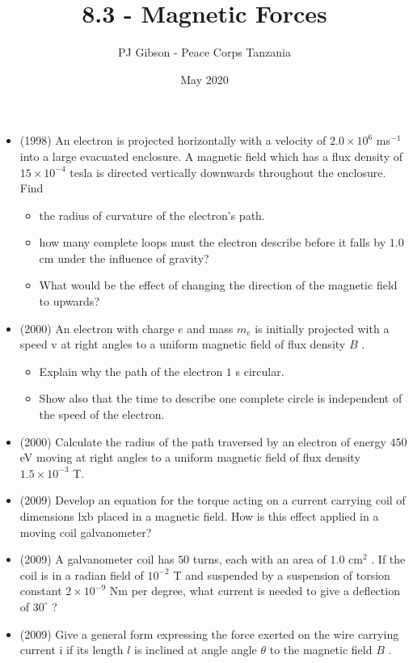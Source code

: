 \documentclass{article}
\title{\textbf{8.3 - Magnetic Forces}}
\author{PJ Gibson - Peace Corps Tanzania}
\date{May 2020}
\begin{document}
\maketitle

\begin{itemize}
\item (1998)  An electron is projected horizontally with a velocity of $ 2.0 \times 10^{6}$ ms$ ^{-1}$ into a large evacuated enclosure. A magnetic field which has a flux density of $ 15 \times 10^{-4}$ tesla is directed vertically downwards throughout the enclosure. Find
 \begin{itemize}
\item the radius of curvature of the electron's path.
\item how many complete loops must the electron describe before it falls by $ 1.0$ cm under the influence of gravity?
\item What would be the effect of changing the direction of the magnetic field to upwards?
\end{itemize}
\item (2000)  An electron with charge $ e$ and mass $ m_{e}$ is initially projected with a speed v at right angles to a uniform magnetic field of flux density $ B$ .
 \begin{itemize}
\item Explain why the path of the electron $ 1$ s circular.
\item Show also that the time to describe one complete circle is independent of the speed of the electron.
\end{itemize}
\item (2000)  Calculate the radius of the path traversed by an electron of energy $ 450$ eV moving at right angles to a uniform magnetic field of flux density $ 1.5\times 10^{-3}$ T.
\item (2009)  Develop an equation for the torque acting on a current carrying coil of dimensions lxb placed in a magnetic field.  How is this effect applied in a moving coil galvanometer?
\item (2009)  A galvanometer coil has $ 50$ turns, each with an area of $ 1.0 $ cm$ ^{2}$ .  If the coil is in a radian field of $ 10^{-2}$ T and suspended by a suspension of torsion constant $ 2 \times 10^{-9}$ Nm per degree, what current is needed to give a deflection of $ 30^{\circ}$ ?
\item (2009)  Give a general form expressing the force exerted on the wire carrying current i if its length $ l$ is inclined at angle angle $ \theta $ to the magnetic field $ B$ .  

\end{itemize}
\end{document}
